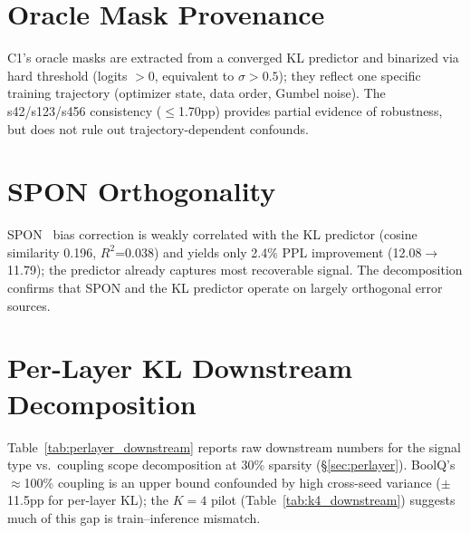 \section{Oracle Mask Provenance}
\label{app:oracle_provenance}

C1's oracle masks are extracted from a converged KL predictor and binarized via hard threshold (logits $> 0$, equivalent to $\sigma > 0.5$); they reflect one specific training trajectory (optimizer state, data order, Gumbel noise).
The s42/s123/s456 consistency ($\leq$1.70pp) provides partial evidence of robustness, but does not rule out trajectory-dependent confounds.

\section{SPON Orthogonality}
\label{app:spon}

SPON~\cite{xu2025spon} bias correction is weakly correlated with the KL predictor (cosine similarity 0.196, $R^2$=0.038) and yields only 2.4\% PPL improvement (12.08$\to$11.79); the predictor already captures most recoverable signal. %
The decomposition confirms that SPON and the KL predictor operate on largely orthogonal error sources.

\section{Per-Layer KL Downstream Decomposition}
\label{app:perlayer_downstream}

Table~\ref{tab:perlayer_downstream} reports raw downstream numbers for the signal type vs.\ coupling scope decomposition at 30\% sparsity (\S\ref{sec:perlayer}). BoolQ's $\approx$100\% coupling is an upper bound confounded by high cross-seed variance ($\pm$11.5pp for per-layer KL); the $K{=}4$ pilot (Table~\ref{tab:k4_downstream}) suggests much of this gap is train--inference mismatch.

